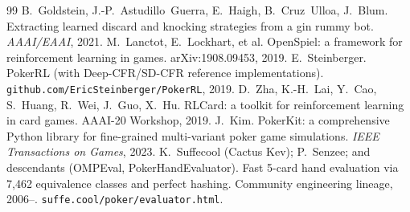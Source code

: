 \begin{thebibliography}{99}
 B.~Goldstein, J.-P.~Astudillo~Guerra, E.~Haigh, B.~Cruz~Ulloa, J.~Blum. Extracting learned discard and knocking strategies from a gin rummy bot. \emph{AAAI/EAAI}, 2021.
 M.~Lanctot, E.~Lockhart, et al. OpenSpiel: a framework for reinforcement learning in games. arXiv:1908.09453, 2019.
 E.~Steinberger. PokerRL (with Deep-CFR/SD-CFR reference implementations). \texttt{github.com/EricSteinberger/PokerRL}, 2019.
 D.~Zha, K.-H.~Lai, Y.~Cao, S.~Huang, R.~Wei, J.~Guo, X.~Hu. RLCard: a toolkit for reinforcement learning in card games. AAAI-20 Workshop, 2019.
 J.~Kim. PokerKit: a comprehensive Python library for fine-grained multi-variant poker game simulations. \emph{IEEE Transactions on Games}, 2023.
 K.~Suffecool (Cactus Kev); P.~Senzee; and descendants (OMPEval, PokerHandEvaluator). Fast 5-card hand evaluation via 7{,}462 equivalence classes and perfect hashing. Community engineering lineage, 2006--. \texttt{suffe.cool/poker/evaluator.html}.

\end{thebibliography}
\endgroup
